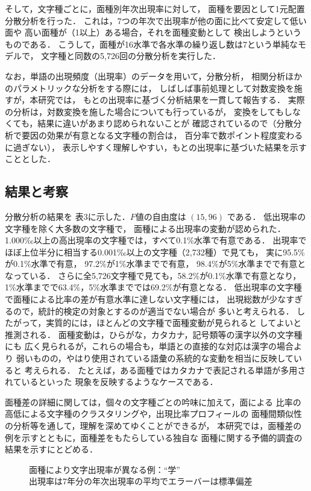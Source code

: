   そして，文字種ごとに，面種別年次出現率に対して，
面種を要因として1元配置分散分析を行った．
これは，7つの年次で出現率が他の面に比べて安定して低い面や
高い面種が（1以上）ある場合，それを面種変動として
検出しようというものである．
こうして，面種が16水準で各水準の繰り返し数は7という単純なモデルで，
文字種と同数の5,726回の分散分析を実行した．

  なお，単語の出現頻度（出現率）のデータを用いて，分散分析，
相関分析ほかのパラメトリックな分析をする際には，
しばしば事前処理として対数変換を施すが，本研究では，
もとの出現率に基づく分析結果を一貫して報告する．
実際の分析は，対数変換を施した場合についても行っているが，
変換をしてもしなくても，結果に違いがあまり認められないことが
確認されているので（分散分析で要因の効果が有意となる文字種の割合は，
百分率で数ポイント程度変わるに過ぎない），
表示しやすく理解しやすい，もとの出現率に基づいた結果を示すこととした．

\subsection{結果と考察}

  分散分析の結果を 表3に示した．$F$値の自由度は $(15,96)$ である．
低出現率の文字種を除く大多数の文字種で，
面種による出現率の変動が認められた．
1.000‰以上の高出現率の文字種では，すべて0.1\%水準で有意である．
出現率でほぼ上位半分に相当する0.001‰以上の文字種（2,732種）で見ても，
実に95.5\%が0.1\%水準で有意，
97.2\%が1\%水準までで有意，
98.4\%が5\%水準までで有意となっている．
さらに全5,726文字種で見ても，58.2\%が0.1\%水準で有意となり，
1\%水準までで63.4\%，5\%水準まででは69.2\%が有意となる．
低出現率の文字種で面種による比率の差が有意水準に達しない文字種には，
出現総数が少なすぎるので，統計的検定の対象とするのが適当でない場合が
多いと考えられる．
したがって，実質的には，ほとんどの文字種で面種変動が見られると
してよいと推測される．
面種変動は，ひらがな，カタカナ，記号類等の漢字以外の文字種にも
広く見られるが，これらの場合も，単語との直接的な対応は漢字の場合より
弱いものの，やはり使用されている語彙の系統的な変動を相当に反映していると
考えられる．
たとえば，ある面種ではカタカナで表記される単語が多用されているといった
現象を反映するようなケースである．



  面種差の詳細に関しては，個々の文字種ごとの吟味に加えて，面による
比率の高低による文字種のクラスタリングや，出現比率プロフィールの
面種間類似性の分析等を通して，理解を深めてゆくことができるが，
本研究では，面種差の例を示すとともに，面種差をもたらしている独自な
面種に関する予備的調査の結果を示すにとどめる．
\begin{figure}[htb]  
\begin{center}
\end{center}
\caption{面種により文字出現率が異なる例：“学”\\
出現率は7年分の年次出現率の平均でエラーバーは標準偏差}
\label{図1}
\end{figure}

